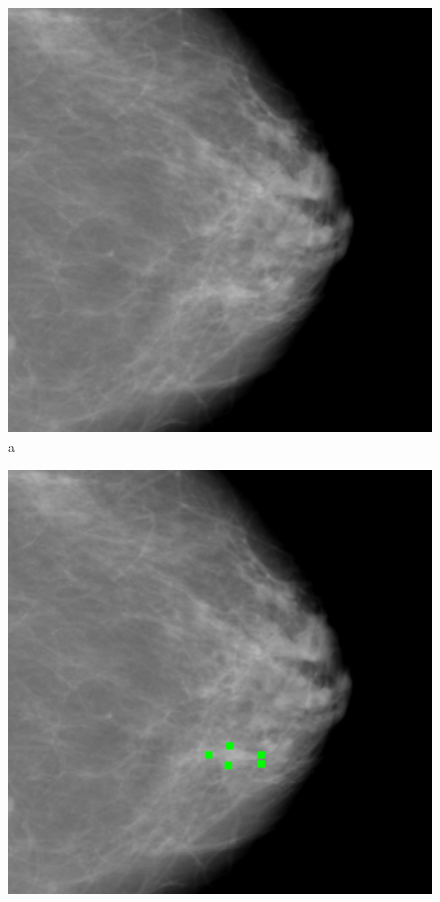 \documentclass[a4paper,11pt,twoside,openright]{report}
\theoremstyle{definition}
\begin{document}
\begin{figure}[h!]
\begin{center}
	\begin{center}
		\includegraphics[width=1.0\textwidth]{170}
		a
	\end{center}
	\endminipage\hfill
	\begin{center}
		\includegraphics[width=1.0\textwidth]{171}

\end{center}
\end{center}
\end{figure}
\end{document}

